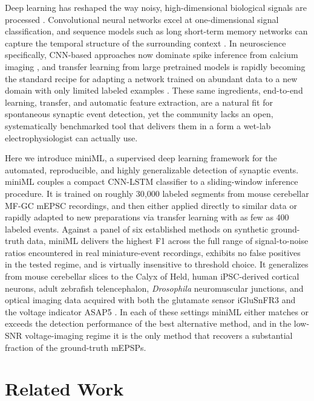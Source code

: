 \documentclass[11pt]{article}
\begin{document}
Deep learning has reshaped the way noisy, high-dimensional biological signals
are processed \citep{lecun2015deep}. Convolutional neural networks excel at
one-dimensional signal classification, and sequence models such as long
short-term memory networks can capture the temporal structure of the
surrounding context \citep{fawaz2019deeptsc}. In neuroscience specifically,
CNN-based approaches now dominate spike inference from calcium imaging
\citep{rupprecht2021cascade}, and transfer learning from large pretrained
models is rapidly becoming the standard recipe for adapting a network trained
on abundant data to a new domain with only limited labeled examples
\citep{theodoris2023transfer, yosinski2014transferable}. These same
ingredients, end-to-end learning, transfer, and automatic feature extraction,
are a natural fit for spontaneous synaptic event detection, yet the community
lacks an open, systematically benchmarked tool that delivers them in a form a
wet-lab electrophysiologist can actually use.

Here we introduce miniML, a supervised deep learning framework for the
automated, reproducible, and highly generalizable detection of synaptic
events. miniML couples a compact CNN-LSTM classifier to a sliding-window
inference procedure. It is trained on roughly 30{,}000 labeled segments from
mouse cerebellar MF-GC mEPSC recordings, and then either applied directly to
similar data or rapidly adapted to new preparations via transfer learning
with as few as 400 labeled events. Against a panel of six established methods
on synthetic ground-truth data, miniML delivers the highest F1 across the
full range of signal-to-noise ratios encountered in real miniature-event
recordings, exhibits no false positives in the tested regime, and is
virtually insensitive to threshold choice. It generalizes from mouse
cerebellar slices to the Calyx of Held, human iPSC-derived cortical neurons,
adult zebrafish telencephalon, \textit{Drosophila} neuromuscular junctions,
and optical imaging data acquired with both the glutamate sensor iGluSnFR3
\citep{aggarwal2023iglusnfr3} and the voltage indicator ASAP5
\citep{hao2024asap5}. In each of these settings miniML either matches or
exceeds the detection performance of the best alternative method, and in the
low-SNR voltage-imaging regime it is the only method that recovers a
substantial fraction of the ground-truth mEPSPs.

\section{Related Work}
\end{document}
